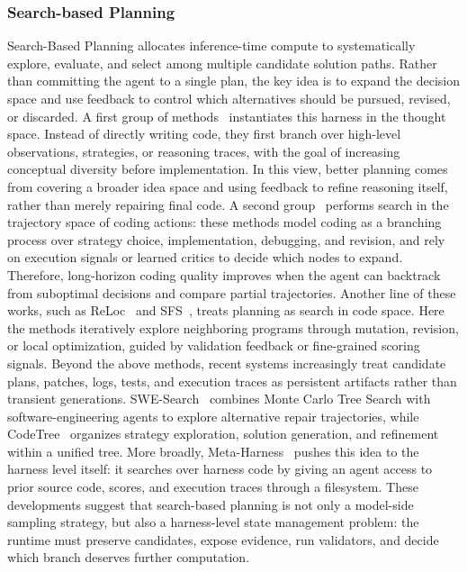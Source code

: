 \subsubsection{Search-based Planning}
Search-Based Planning allocates inference-time compute to systematically explore, evaluate, and select among multiple candidate solution paths. Rather than committing the agent to a single plan, the key idea is to expand the decision space and use feedback to control which alternatives should be pursued, revised, or discarded. A first group of methods~\cite{wang2024planning,li2025rethinkmcts} instantiates this harness in the thought space. Instead of directly writing code, they first branch over high-level observations, strategies, or reasoning traces, with the goal of increasing conceptual diversity before implementation. In this view, better planning comes from covering a broader idea space and using feedback to refine reasoning itself, rather than merely repairing final code. A second group~\cite{li2025codetree,ni2024treeofcode,dainese2024codegenerating,aggarwal2025dars} performs search in the trajectory space of coding actions: these methods model coding as a branching process over strategy choice, implementation, debugging, and revision, and rely on execution signals or learned critics to decide which nodes to expand. Therefore, long-horizon coding quality improves when the agent can backtrack from suboptimal decisions and compare partial trajectories. Another line of these works, such as ReLoc~\cite{lyu2025reloc} and SFS~\cite{light2025sfs}, treats planning as search in code space. Here the methods iteratively explore neighboring programs through mutation, revision, or local optimization, guided by validation feedback or fine-grained scoring signals.
Beyond the above methods, recent systems increasingly treat candidate plans, patches, logs, tests, and execution traces as persistent artifacts rather than transient generations. SWE-Search~\cite{sweSearch2024} combines Monte Carlo Tree Search with software-engineering agents to explore alternative repair trajectories, while CodeTree~\cite{li2025codetree} organizes strategy exploration, solution generation, and refinement within a unified tree. More broadly, Meta-Harness~\cite{lee2026metaharness} pushes this idea to the harness level itself: it searches over harness code by giving an agent access to prior source code, scores, and execution traces through a filesystem. These developments suggest that search-based planning is not only a model-side sampling strategy, but also a harness-level state management problem: the runtime must preserve candidates, expose evidence, run validators, and decide which branch deserves further computation.

